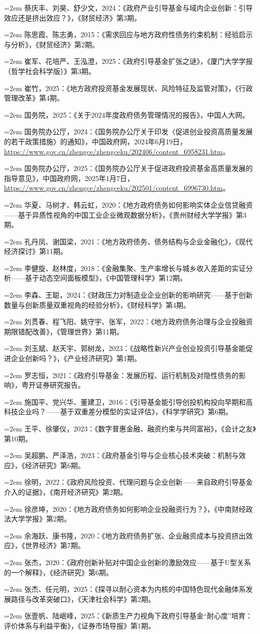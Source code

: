 \documentclass[UTF8,a4paper,zihao=5,fontset=fandol]{ctexart}
\newcommand{\ERJRef}[1]{%
  \par\noindent\hspace*{2em}\hangindent=2em\hangafter=1 {#1}\par%
}
\begin{document}
{\songti{}
\ERJRef{蔡庆丰、刘昊、舒少文，2024：《政府产业引导基金与域内企业创新：引导效应还是挤出效应？》，《财贸经济》第3期。}
\ERJRef{陈思霞、陈志勇，2015：《需求回应与地方政府性债务约束机制：经验启示与分析》，《财贸经济》第2期。}
\ERJRef{崔军、花培严、王泓澄，2025：《政府引导基金扩张之谜》，《厦门大学学报（哲学社会科学版）》第3期。}
\ERJRef{崔竹，2025：《地方政府投资基金发展现状、风险特征及监管对策》，《行政管理改革》第4期。}
\ERJRef{国务院，2025：《关于2024年度政府债务管理情况的报告》，中国人大网。}
\ERJRef{国务院办公厅，2024：《国务院办公厅关于印发〈促进创业投资高质量发展的若干政策措施〉的通知》，中国政府网，2024年6月19日，\url{https://www.gov.cn/zhengce/zhengceku/202406/content_6958231.htm}。}
\ERJRef{国务院办公厅，2025：《国务院办公厅关于促进政府投资基金高质量发展的指导意见》，中国政府网，2025年1月7日，\url{https://www.gov.cn/zhengce/zhengceku/202501/content_6996730.htm}。}
\ERJRef{华夏、马树才、韩云虹，2020：《地方政府债务如何影响实体企业信贷融资——基于异质性视角的中国工业企业微观数据分析》，《贵州财经大学学报》第3期。}
\ERJRef{孔丹凤、谢国梁，2021：《地方政府债务、债务结构与企业金融化》，《现代经济探讨》第11期。}
\ERJRef{李健旋、赵林度，2018：《金融集聚、生产率增长与城乡收入差距的实证分析——基于动态空间面板模型》，《中国管理科学》第12期。}
\ERJRef{李森、王聪，2024：《财政压力对制造业企业创新的影响研究——基于创新数量与创新质量双重视角的经验分析》，《财经科学》第4期。}
\ERJRef{刘贯春、程飞阳、姚守宇、张军，2022：《地方政府债务治理与企业投融资期限错配改善》，《管理世界》第11期。}
\ERJRef{刘玉斌、赵天宇、郭树龙，2023：《战略性新兴产业创业投资引导基金能促进企业创新吗？》，《产业经济研究》第1期。}
\ERJRef{罗志恒，2021：《政府引导基金：发展历程、运行机制及对隐性债务的影响》，粤开证券研究报告。}
\ERJRef{施国平、党兴华、董建卫，2016：《引导基金能引导创投机构投向早期和高科技企业吗？——基于双重差分模型的实证评估》，《科学学研究》第6期。}
\ERJRef{王平、徐肇仪，2023：《数字普惠金融、融资约束与共同富裕》，《会计之友》第10期。}
\ERJRef{吴超鹏、严泽浩，2023：《政府基金引导与企业核心技术突破：机制与效应》，《经济研究》第6期。}
\ERJRef{徐明，2022：《政府风险投资、代理问题与企业创新——来自政府引导基金介入的证据》，《南开经济研究》第2期。}
\ERJRef{徐彦坤，2020：《地方政府债务如何影响企业投融资行为？》，《中南财经政法大学学报》第2期。}
\ERJRef{余海跃、康书隆，2020：《地方政府债务扩张、企业融资成本与投资挤出效应》，《世界经济》第7期。}
\ERJRef{张杰，2020：《政府创新补贴对中国企业创新的激励效应——基于U型关系的一个解释》，《经济研究》第6期。}
\ERJRef{张杰、任元明，2025：《探寻以耐心资本为内核的中国特色现代金融体系发展路径与改革突破口》，《天津社会科学》第2期。}
\ERJRef{张壹帆、陆岷峰，2025：《新质生产力视角下政府引导基金“耐心度”培育：评价体系与利益平衡》，《证券市场导报》第1期。}
}
\end{document}
